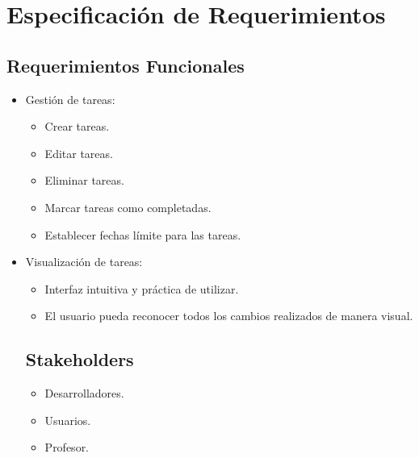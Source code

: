 \chapter{Especificación de Requerimientos}
\section{Requerimientos Funcionales}
\begin{itemize}
  \item Gestión de tareas:
    \begin{itemize}
      \item Crear tareas.
      \item Editar tareas.
      \item Eliminar tareas.
      \item Marcar tareas como completadas.
      \item Establecer fechas límite para las tareas.
    \end{itemize}
  \item Visualización de tareas:
    \begin{itemize}
      \item Interfaz intuitiva y práctica de utilizar.
      \item El usuario pueda reconocer todos los cambios realizados de manera visual.
    \end{itemize}
    \section{Stakeholders}
    \begin{itemize}
        \item Desarrolladores.
        \item Usuarios.
        \item Profesor.
    \end{itemize}
\end{itemize}
